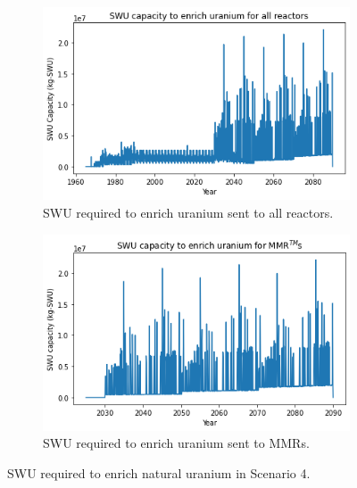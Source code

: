 \documentclass[preprint]{elsarticle}
\providecommand{\DIFaddbeginFL}{} %
\providecommand{\DIFaddendFL}{} %
\providecommand{\DIFdelbeginFL}{} %
\providecommand{\DIFdelendFL}{} %
\begin{document}
\begin{figure}
    \centering
    \begin{subfigure}{0.5\textwidth}
        \centering
        \DIFdelbeginFL %
\DIFdelendFL \DIFaddbeginFL \includegraphics[scale=0.5]{../figures/totalswu_scenarios_4.png}
        \DIFaddendFL \caption{\gls{SWU} required to enrich uranium sent to all reactors.}
        \label{fig:totalswu_4}
    \end{subfigure}
    \hspace{0.8cm}
    \begin{subfigure}{0.5\textwidth}
        \centering
        \DIFdelbeginFL %
\DIFdelendFL \DIFaddbeginFL \includegraphics[scale=0.5]{../figures/haleuSWU_scenarios_4.png}
        \DIFaddendFL \caption{\gls{SWU} required to enrich uranium sent to \glspl{MMR}.}
        \label{fig:haleuswu_4}
    \end{subfigure}
    \caption{\gls{SWU} required to enrich natural uranium in Scenario 4.}
    \label{fig:swu_4}
\end{figure}
\end{document}
